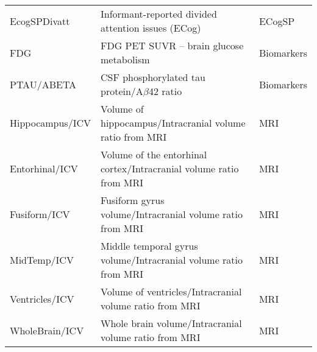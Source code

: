 \begin{table}[H]
\begin{adjustbox}{max width=\textwidth}
\begin{tabularx}{\textwidth}{>{\raggedright\arraybackslash}p{3cm} >{\raggedright\arraybackslash}X >{\raggedright\arraybackslash}p{3cm}}
			EcogSPDivatt          & Informant-reported divided attention issues (ECog)                                 & ECogSP                \\
			FDG                   & FDG PET SUVR – brain glucose metabolism                                            & Biomarkers            \\
			PTAU/ABETA            & CSF phosphorylated tau protein/A$\beta$42 ratio                                     & Biomarkers            \\
			Hippocampus/ICV       & Volume of hippocampus/Intracranial volume ratio from MRI                           & MRI                   \\
			Entorhinal/ICV        & Volume of the entorhinal cortex/Intracranial volume ratio from MRI                 & MRI                   \\
			Fusiform/ICV          & Fusiform gyrus volume/Intracranial volume ratio from MRI                           & MRI                   \\
			MidTemp/ICV           & Middle temporal gyrus volume/Intracranial volume ratio from MRI                    & MRI                   \\
			Ventricles/ICV        & Volume of ventricles/Intracranial volume ratio from MRI                            & MRI                   \\
			WholeBrain/ICV        & Whole brain volume/Intracranial volume ratio from MRI                              & MRI                   \\
			\bottomrule
		\end{tabularx}
	\end{adjustbox}
\end{table}

\newpage
